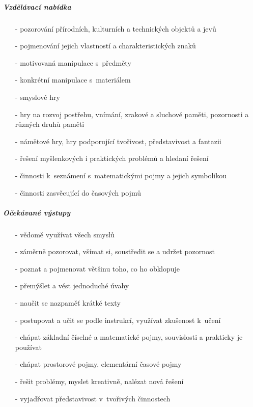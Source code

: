 					\subparagraph{Vzdělávací nabídka}

					\begin{itemize}
					\setlength\itemsep{-2mm}
						\item[-]pozorování přírodních, kulturních a technických objektů a jevů
						\item[-]pojmenování jejich vlastností a charakteristických znaků
						\item[-]motivovaná manipulace s~předměty
						\item[-]konkrétní manipulace s~materiálem
						\item[-]smyslové hry
						\item[-]hry na rozvoj postřehu, vnímání, zrakové a sluchové paměti, pozornosti a různých druhů paměti
						\item[-]námětové hry, hry podporující tvořivost, představivost a fantazii
						\item[-]řešení myšlenkových i praktických problémů a hledaní řešení
						\item[-]činnosti k~seznámení s~matematickými pojmy a jejich symbolikou
						\item[-]činnosti zasvěcující do časových pojmů
					\end{itemize}

					\subparagraph{Očekávané výstupy}

					\begin{itemize}
					\setlength\itemsep{-2mm}
						\item[-]vědomě využívat všech smyslů
						\item[-]záměrně pozorovat, všímat si, soustředit se a udržet pozornost
						\item[-]poznat a pojmenovat většinu toho, co ho obklopuje
						\item[-]přemýšlet a vést jednoduché úvahy
						\item[-]naučit se nazpaměť krátké texty
						\item[-]postupovat a učit se podle instrukcí, využívat zkušenost k~učení
						\item[-]chápat základní číselné a matematické pojmy, souvislosti a prakticky je používat
						\item[-]chápat prostorové pojmy, elementární časové pojmy
						\item[-]řešit problémy, myslet kreativně, nalézat nová řešení
						\item[-]vyjadřovat představivost v~tvořivých činnostech
					\end{itemize}
									
